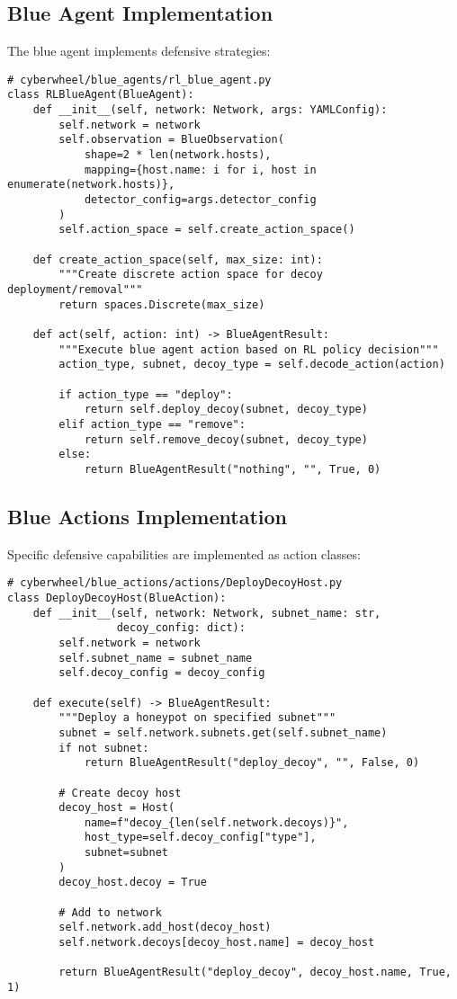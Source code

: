 \documentclass[12pt,a4paper]{article}
\begin{document}
\subsection{Blue Agent Implementation}
The blue agent implements defensive strategies:

\begin{lstlisting}[caption=Blue Agent Base Implementation]
# cyberwheel/blue_agents/rl_blue_agent.py
class RLBlueAgent(BlueAgent):
    def __init__(self, network: Network, args: YAMLConfig):
        self.network = network
        self.observation = BlueObservation(
            shape=2 * len(network.hosts),
            mapping={host.name: i for i, host in enumerate(network.hosts)},
            detector_config=args.detector_config
        )
        self.action_space = self.create_action_space()
        
    def create_action_space(self, max_size: int):
        """Create discrete action space for decoy deployment/removal"""
        return spaces.Discrete(max_size)
        
    def act(self, action: int) -> BlueAgentResult:
        """Execute blue agent action based on RL policy decision"""
        action_type, subnet, decoy_type = self.decode_action(action)
        
        if action_type == "deploy":
            return self.deploy_decoy(subnet, decoy_type)
        elif action_type == "remove":
            return self.remove_decoy(subnet, decoy_type)
        else:
            return BlueAgentResult("nothing", "", True, 0)
\end{lstlisting}

\subsection{Blue Actions Implementation}
Specific defensive capabilities are implemented as action classes:

\begin{lstlisting}[caption=Deploy Decoy Action Implementation]
# cyberwheel/blue_actions/actions/DeployDecoyHost.py
class DeployDecoyHost(BlueAction):
    def __init__(self, network: Network, subnet_name: str, 
                 decoy_config: dict):
        self.network = network
        self.subnet_name = subnet_name
        self.decoy_config = decoy_config
        
    def execute(self) -> BlueAgentResult:
        """Deploy a honeypot on specified subnet"""
        subnet = self.network.subnets.get(self.subnet_name)
        if not subnet:
            return BlueAgentResult("deploy_decoy", "", False, 0)
            
        # Create decoy host
        decoy_host = Host(
            name=f"decoy_{len(self.network.decoys)}",
            host_type=self.decoy_config["type"],
            subnet=subnet
        )
        decoy_host.decoy = True
        
        # Add to network
        self.network.add_host(decoy_host)
        self.network.decoys[decoy_host.name] = decoy_host
        
        return BlueAgentResult("deploy_decoy", decoy_host.name, True, 1)
\end{lstlisting}
\end{document}
